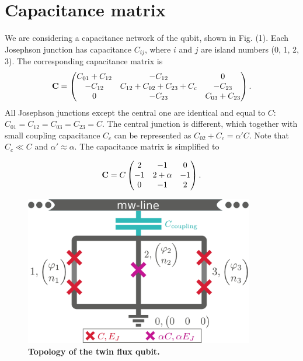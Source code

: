 \documentclass[%
superscriptaddress,
preprint,
preprintnumbers,
bibnotes,
amsmath,
amssymb,
aps,
showkeys,
prb,
]{revtex4-1}
\begin{document}

\section{Capacitance matrix}
\label{sec:capacitance-matrix}

We are considering a capacitance network of the qubit, shown in Fig. (1). Each Josephson junction has capacitance $C_{ij}$, where $i$ and $j$ are island numbers (0, 1, 2, 3). The corresponding capacitance matrix is
  \begin{equation}
\bold{C} =  \begin{pmatrix}
      C_{01} + C_{12}& -C_{12} & 0\\
      -C_{12} & C_{12} + C_{02} + C_{23} + C_c & -C_{23}\\
      0 & -C_{23} & C_{03} + C_{23}
    \end{pmatrix}
    .
  \end{equation}
All Josephson junctions except the central one are identical and equal to $C$: $C_{01} = C_{12} = C_{03} = C_{23} = C$. The central junction is different, which together with small coupling capacitance $C_c$ can be represented as $C_{02} + C_c = \alpha' C$. Note that $C_c \ll C$ and $\alpha' \approx \alpha$.
The capacitance matrix is simplified to
\begin{framed}\noindent
  \begin{equation}
\bold{C} =  C \begin{pmatrix}
      2 & -1 & 0\\
      -1 & 2 + \alpha & -1\\
      0 & -1 & 2
    \end{pmatrix}
    .
  \end{equation}

\end{framed}

\begin{figure}[ht]
  \centering
  \includegraphics[width=100mm]{fig1_supp}
  \caption{\textbf{Topology of the twin flux qubit.}\label{fig:supp1}}
\end{figure}
\end{document}
